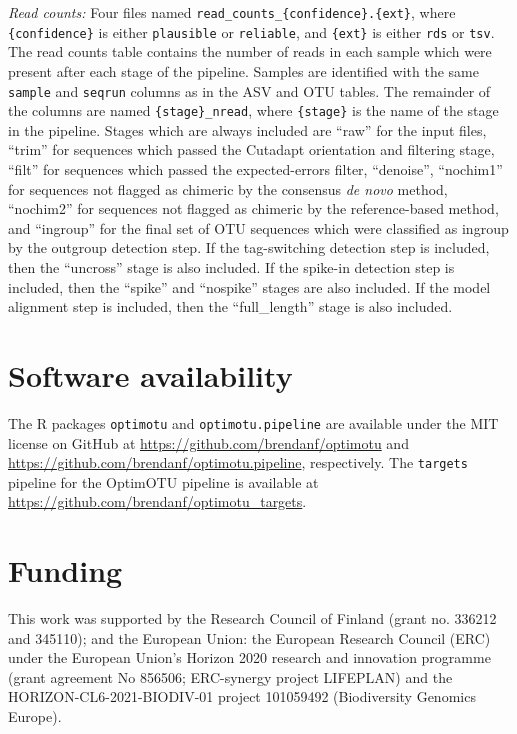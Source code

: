 \documentclass[
]{article}
\begin{document}
\emph{Read counts:} Four files named \texttt{read\_counts\_\{confidence\}.\{ext\}}, where \texttt{\{confidence\}} is either \texttt{plausible} or \texttt{reliable}, and \texttt{\{ext\}} is either \texttt{rds} or \texttt{tsv}.
The read counts table contains the number of reads in each sample which were present after each stage of the pipeline.
Samples are identified with the same \texttt{sample} and \texttt{seqrun} columns as in the ASV and OTU tables.
The remainder of the columns are named \texttt{\{stage\}\_nread}, where \texttt{\{stage\}} is the name of the stage in the pipeline.
Stages which are always included are ``raw'' for the input files, ``trim'' for sequences which passed the Cutadapt orientation and filtering stage, ``filt'' for sequences which passed the expected-errors filter, ``denoise'', ``nochim1'' for sequences not flagged as chimeric by the consensus \emph{de novo} method, ``nochim2'' for sequences not flagged as chimeric by the reference-based method, and ``ingroup'' for the final set of OTU sequences which were classified as ingroup by the outgroup detection step.
If the tag-switching detection step is included, then the ``uncross'' stage is also included.
If the spike-in detection step is included, then the ``spike'' and ``nospike'' stages are also included.
If the model alignment step is included, then the ``full\_length'' stage is also included.

\section*{Software availability}\label{software-availability}

The R packages \texttt{optimotu} and \texttt{optimotu.pipeline} are available under the MIT license on GitHub at \url{https://github.com/brendanf/optimotu} and \url{https://github.com/brendanf/optimotu.pipeline}, respectively.
The \texttt{targets} pipeline for the OptimOTU pipeline is available at \url{https://github.com/brendanf/optimotu_targets}.

\section*{Funding}\label{funding}

This work was supported by the Research Council of Finland (grant no. 336212 and 345110); and the European Union: the European Research Council (ERC) under the European Union's Horizon 2020 research and innovation programme (grant agreement No 856506; ERC-synergy project LIFEPLAN) and the HORIZON-CL6-2021-BIODIV-01 project 101059492 (Biodiversity Genomics Europe).
\end{document}

